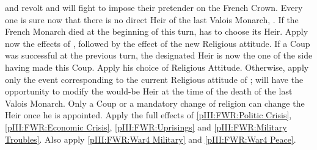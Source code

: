\phevnt
\aparag \hug and \lig revolt and will fight to impose their pretender on the
French Crown. Every one is sure now that there is no direct Heir of the last
Valois Monarch, .
\aparag If the French Monarch  died at the beginning of
this turn, \FRA has to choose its Heir. Apply now the effects of
, followed by the effect of the new
Religious attitude.
\aparag If a Coup was successful at the previous turn, the designated Heir is
now the one of the side having made this Coup. Apply his choice of Religious
Attitude.
\aparag Otherwise, apply only the event corresponding to the current Religious
attitude of \FRA; \FRA will have the opportunity to modify the would-be Heir
at the time of the death of the last Valois Monarch.
\aparag Only a Coup or a mandatory change of religion can change the Heir once
he is appointed.
\aparag Apply the full effects of \ref{pIII:FWR:Politic Crisis},
\ref{pIII:FWR:Economic Crisis}, \ref{pIII:FWR:Uprisings} and
\ref{pIII:FWR:Military Troubles}. Also apply \ref{pIII:FWR:War4 Military} and
\ref{pIII:FWR:War4 Peace}.

